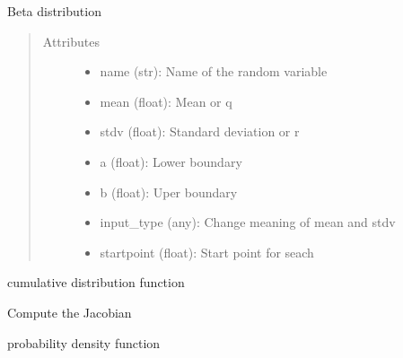 \documentclass[letterpaper,10pt,english]{sphinxmanual}
\begin{document}
\begin{fulllineitems}
Beta distribution
\begin{quote}\begin{description}
\item[{Attributes }] \leavevmode\begin{itemize}
\item {} 
name (str):   Name of the random variable

\item {} 
mean (float): Mean or q

\item {} 
stdv (float): Standard deviation or r

\item {} 
a (float):    Lower boundary

\item {} 
b (float):    Uper boundary

\item {} 
input\_type (any): Change meaning of mean and stdv

\item {} 
startpoint (float): Start point for seach

\end{itemize}

\end{description}\end{quote}


\begin{fulllineitems}
cumulative distribution function

\end{fulllineitems}



\begin{fulllineitems}
Compute the Jacobian

\end{fulllineitems}



\begin{fulllineitems}
probability density function


\end{fulllineitems}
\end{fulllineitems}
\end{document}
